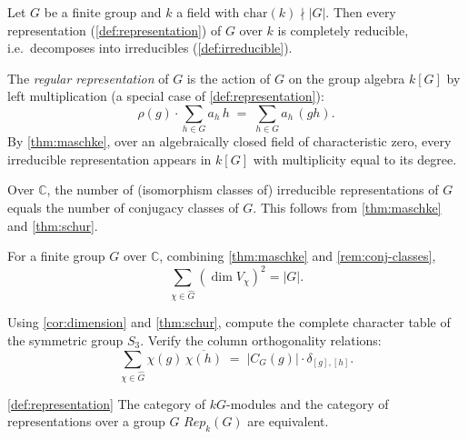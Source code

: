 \begin{theorem}
\label{thm:maschke}
Let $G$ be a finite group and $k$ a field with $\mathrm{char}(k) \nmid |G|$.
Then every representation (\ref{def:representation}) of $G$ over $k$ is
completely reducible, i.e.\ decomposes into irreducibles (\ref{def:irreducible}).
\end{theorem}

\begin{example}
\label{ex:regular}
The \textit{regular representation} of $G$ is the action of $G$ on the group
algebra $k[G]$ by left multiplication (a special case of \ref{def:representation}):
\[
  \rho(g) \cdot \sum_{h \in G} a_h \, h \;=\; \sum_{h \in G} a_h \, (gh).
\]
By \ref{thm:maschke}, over an algebraically closed field of characteristic zero,
every irreducible representation appears in $k[G]$ with multiplicity equal to
its degree.
\end{example}

\begin{remark}
\label{rem:conj-classes}
Over $\mathbb{C}$, the number of (isomorphism classes of) irreducible
representations of $G$ equals the number of conjugacy classes of $G$.
This follows from \ref{thm:maschke} and \ref{thm:schur}.
\end{remark}

\begin{corollary}
\label{cor:dimension}
For a finite group $G$ over $\mathbb{C}$, combining \ref{thm:maschke} and
\ref{rem:conj-classes},
\[
  \sum_{\chi \in \hat{G}} (\dim V_\chi)^2 = |G|.
\]
\end{corollary}

\begin{problem}
\label{prob:s3}
Using \ref{cor:dimension} and \ref{thm:schur}, compute the complete character
table of the symmetric group $S_3$.
Verify the column orthogonality relations:
\[
  \sum_{\chi \in \hat{G}} \chi(g)\,\overline{\chi(h)}
  \;=\; |C_G(g)| \cdot \delta_{[g],[h]}.
\]
\end{problem}

\begin{theorem}
\label{thm:equivcatrep}
\ref{def:representation}
The category of $kG$-modules and the category of representations over a group $G$ $Rep_k (G)$ are equivalent.
\end{theorem}

